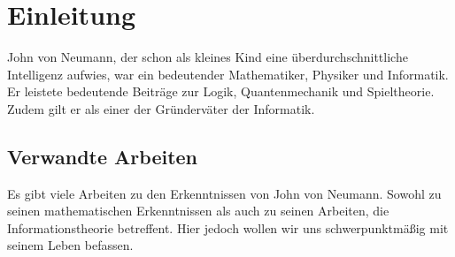 
\chapter{Einleitung}

John von Neumann, der schon als kleines Kind eine überdurchschnittliche Intelligenz aufwies, war ein bedeutender Mathematiker, Physiker und Informatik. Er leistete bedeutende Beiträge zur Logik, Quantenmechanik und Spieltheorie. Zudem gilt er als einer der Gründerväter der Informatik.

\section{Verwandte Arbeiten}

Es gibt viele Arbeiten zu den Erkenntnissen von John von Neumann. Sowohl zu seinen mathematischen Erkenntnissen als auch zu seinen Arbeiten, die Informationstheorie betreffent. Hier jedoch wollen wir uns schwerpunktmäßig mit seinem Leben befassen.
